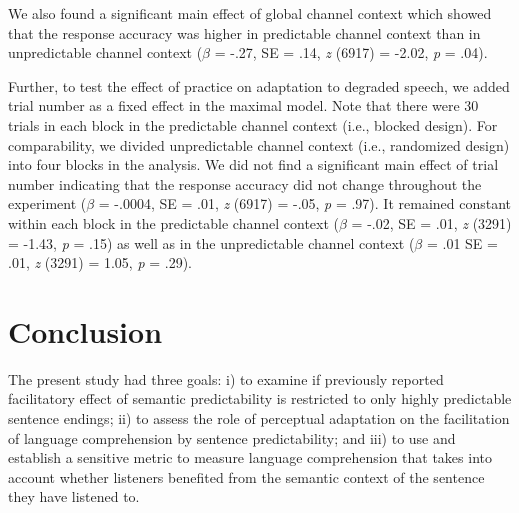 \documentclass[a4paper, nobind]{templates/ociamthesis}
\begin{document}
We also found a significant main effect of global channel context which showed that the response accuracy was higher in predictable channel context than in unpredictable channel context (\(\beta\) = -.27, SE = .14, \emph{z} (6917) = -2.02, \emph{p} = .04).

Further, to test the effect of practice on adaptation to degraded speech, we added trial number as a fixed effect in the maximal model.
Note that there were 30 trials in each block in the predictable channel context (i.e., blocked design).
For comparability, we divided unpredictable channel context (i.e., randomized design) into four blocks in the analysis.
We did not find a significant main effect of trial number indicating that the response accuracy did not change throughout the experiment (\(\beta\) = -.0004, SE = .01, \emph{z} (6917) = -.05, \emph{p} = .97).
It remained constant within each block in the predictable channel context (\(\beta\) = -.02, SE = .01, \emph{z} (3291) = -1.43, \emph{p} = .15) as well as in the unpredictable channel context (\(\beta\) = .01 SE = .01, \emph{z} (3291) = 1.05, \emph{p} = .29).

\hypertarget{conclusion-1}{%
\section{Conclusion}\label{conclusion-1}}

The present study had three goals: i) to examine if previously reported facilitatory effect of semantic predictability is restricted to only highly predictable sentence endings;
ii) to assess the role of perceptual adaptation on the facilitation of language comprehension by sentence predictability; and
iii) to use and establish a sensitive metric to measure language comprehension that takes into account whether listeners benefited from the semantic context of the sentence they have listened to.
\end{document}

